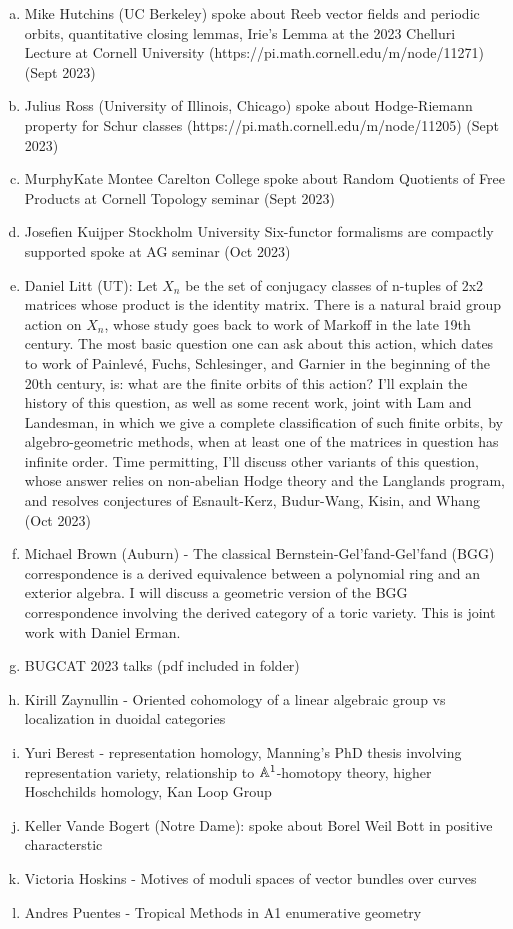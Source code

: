 \documentclass[12pt]{article}
\begin{document}
\begin{enumerate}[(a)]
    \item Mike Hutchins (UC Berkeley) spoke about Reeb vector fields and periodic orbits, quantitative closing lemmas, Irie's Lemma at the 2023 Chelluri Lecture at Cornell University (https://pi.math.cornell.edu/m/node/11271) (Sept 2023) 
    \item Julius Ross (University of Illinois, Chicago) spoke about Hodge-Riemann property for Schur classes (https://pi.math.cornell.edu/m/node/11205) (Sept 2023) 
    \item MurphyKate Montee Carelton College spoke about Random Quotients of Free Products at Cornell Topology seminar (Sept 2023)
    \item Josefien Kuijper Stockholm University Six-functor formalisms are compactly supported spoke at AG seminar (Oct 2023)
    \item Daniel Litt (UT): Let $X_n$ be the set of conjugacy classes of n-tuples of 2x2 matrices whose product is the identity matrix. There is a natural braid group action on $X_n$, whose study goes back to work of Markoff in the late 19th century. The most basic question one can ask about this action, which dates to work of Painlevé, Fuchs, Schlesinger, and Garnier in the beginning of the 20th century, is: what are the finite orbits of this action? I'll explain the history of this question, as well as some recent work, joint with Lam and Landesman, in which we give a complete classification of such finite orbits, by algebro-geometric methods, when at least one of the matrices in question has infinite order. Time permitting, I'll discuss other variants of this question, whose answer relies on non-abelian Hodge theory and the Langlands program, and resolves conjectures of Esnault-Kerz, Budur-Wang, Kisin, and Whang (Oct 2023)
    \item Michael Brown (Auburn) - The classical Bernstein-Gel’fand-Gel’fand (BGG) correspondence is a derived equivalence between a polynomial ring and an exterior algebra. I will discuss a geometric version of the BGG correspondence involving the derived category of a toric variety. This is joint work with Daniel Erman.
    \item BUGCAT 2023 talks (pdf included in folder)
    \item Kirill Zaynullin - Oriented cohomology of a linear algebraic group vs localization in duoidal categories
    \item Yuri Berest - representation homology, Manning's PhD thesis involving representation variety, relationship to $\mathbb{A}^1$-homotopy theory, higher Hoschchilds homology, Kan Loop Group
    \item Keller Vande Bogert (Notre Dame): spoke about Borel Weil Bott in positive characterstic
    \item Victoria Hoskins - Motives of moduli spaces of vector bundles over curves
    \item Andres Puentes - Tropical Methods in A1 enumerative geometry

\end{enumerate}
\end{document}
